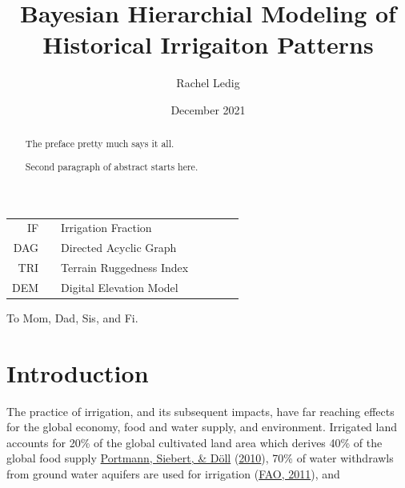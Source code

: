 \documentclass[12pt,twoside]{reedthesis}
\title{Bayesian Hierarchial Modeling of Historical Irrigaiton Patterns}
\author{Rachel Ledig}
\date{December 2021}
\begin{document}
  \maketitle

\frontmatter %
\pagestyle{empty} %



  \hypersetup{linkcolor=black}
  \setcounter{secnumdepth}{2}
  \setcounter{tocdepth}{2}
  \tableofcontents


  \listoftables

  \listoffigures
  \begin{abbreviations}
    \begin{tabular}{rp{0.2cm}lp{1cm}rp{0.2cm}l} IF & &  Irrigation Fraction \\ DAG & &  Directed Acyclic Graph \\ TRI & & Terrain Ruggedness Index \\ DEM & & Digital Elevation Model \\ \end{tabular}
  \end{abbreviations}
  \begin{abstract}
    The preface pretty much says it all.

    \par

    Second paragraph of abstract starts here.
  \end{abstract}
  \begin{dedication}
    To Mom, Dad, Sis, and Fi.
  \end{dedication}
\mainmatter %
\pagestyle{fancyplain} %

\hypertarget{intro}{%
\chapter{Introduction}\label{intro}}

The practice of irrigation, and its subsequent impacts, have far reaching effects for the global economy, food and water supply, and environment. Irrigated land accounts for 20\% of the global cultivated land area which derives 40\% of the global food supply \protect\hyperlink{ref-portmannMIRCA2000GlobalMonthly2010a}{Portmann, Siebert, \& Döll} (\protect\hyperlink{ref-portmannMIRCA2000GlobalMonthly2010a}{2010}), 70\% of water withdrawls from ground water aquifers are used for irrigation (\protect\hyperlink{ref-faoStateWorldLand2011}{FAO, 2011}), and
\end{document}
